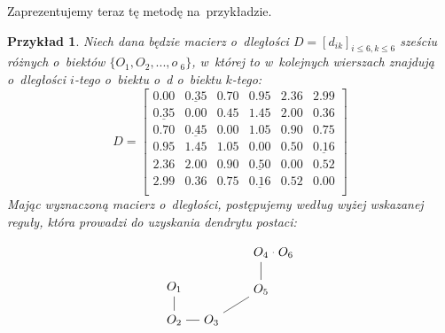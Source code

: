 \documentclass[12pt,a4paper]{report}
\newtheorem{example}{Przykład}
\begin{document}
Zaprezentujemy teraz tę metodę na~przykładzie. 
\begin{example}Niech dana będzie macierz o~dległości $D=[d_{ik}]_{i\leq 6, k \leq 6}$ sześciu różnych o~biektów $\{O_{1},O_{2},..., o~_{6}\}$, w~której to w~kolejnych wierszach znajdują o~dległości $i$-tego o~biektu o~d o~biektu $k$-tego:
$$
D= \begin{bmatrix}
0.00 & \underline{0.35} & 0.70 & 0.95 & 2.36 & 2.99 \\
\underline{0.35} & 0.00 & 0.45 & 1.45 & 2.00 & 0.36 \\ 
0.70 & \underline{0.45} & 0.00 & 1.05 & 0.90 & 0.75 \\
0.95 & 1.45 & 1.05 & 0.00 & 0.50 & \underline{0.16} \\
2.36 & 2.00 & 0.90 & \underline{0.50} & 0.00 & 0.52 \\
2.99 & 0.36 & 0.75 & \underline{0.16} & 0.52 & 0.00  \\
\end{bmatrix}    
$$
Mając wyznaczoną macierz o~dległości, postępujemy według wyżej wskazanej reguły, która prowadzi do uzyskania dendrytu postaci:


$$
\begin{tikzpicture}[scale=.7]
  \node (1) at (0.0,0.1) {$O_{1}$};
  \node (2) at (0.0,-1.25) {$O_{2}$};
  \node (3) at (1.5,-1.25) {$O_{3}$};
 \node (4) at (3.5,1.5) {$O_{4}$};
 \node (5) at (3.5,0.00) {$O_{5}$};
 \node (6) at (4.5,1.5) {$O_{6}$};
 
   \draw (1)--(2)--(3)--(5)--(4)--(6); 
\end{tikzpicture}
$$ 
\end{example}
\end{document}
